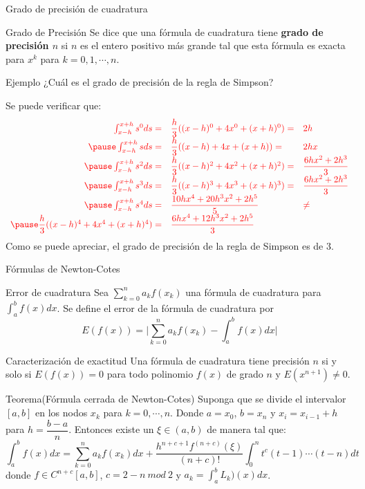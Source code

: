 \begin{frame}{Grado de precisión de cuadratura}
\small
\begin{block}{Grado de Precisión}
Se dice que una fórmula de cuadratura tiene \textbf{grado de precisión $n$} si $n$ es el entero positivo más grande tal que esta fórmula es exacta para $x^k$ para $k=0,1,\cdots, n$.  
\end{block}\pause
\begin{block}{Ejemplo}
¿Cuál es el grado de precisión de la regla de Simpson?
\end{block}\pause
Se puede verificar que:\pause
\vspace*{-0.5cm}
\begin{displaymath}
\textcolor{red}{
\begin{array}{rll}
\int_{x-h}^{x+h}s^0ds=&\dfrac{h}{3}((x-h)^0+4x^0+(x+h)^0)=&2h\\\pause
\int_{x-h}^{x+h}sds=&\dfrac{h}{3}((x-h)+4x+(x+h))=&2hx\\\pause
\int_{x-h}^{x+h}s^2ds=&\dfrac{h}{3}((x-h)^2+4x^2+(x+h)^2)=&\dfrac{6hx^2+2h^3}{3}\\\pause
\int_{x-h}^{x+h}s^3ds=&\dfrac{h}{3}((x-h)^3+4x^3+(x+h)^3)=&\dfrac{6hx^2+2h^3}{3}\\\pause
\int_{x-h}^{x+h}s^4ds=&\dfrac{10hx^4+20h^3x^2+2h^5}{5}&\neq\\\pause
\dfrac{h}{3}((x-h)^4+4x^4+(x+h)^4)=&\dfrac{6hx^4+12h^3x^2+2h^5}{3}&
\end{array}}
\end{displaymath} 
\scriptsize
Como se puede apreciar, el grado de precisión de la regla de Simpson es de 3.
\end{frame}
\begin{frame}{Fórmulas de Newton-Cotes}
\scriptsize
\begin{block}{Error de cuadratura}
Sea $\displaystyle \sum_{k=0}^{n}a_kf(x_k)$ una fórmula de cuadratura para $\displaystyle \int_{a}^{b}f(x)dx$. Se define el error de la fórmula de cuadratura por $$\displaystyle E(f(x))=\bigg|\sum_{k=0}^{n}a_kf(x_k)-\int_{a}^{b}f(x)dx\bigg|$$
\end{block}
\begin{block}{Caracterización de exactitud}
Una fórmula de cuadratura tiene precisión $n$ si y solo si $E(f(x))=0$ para todo polinomio $f(x)$ de grado $n$ y $E(x^{n+1})\neq 0$.
\end{block}
\begin{block}{Teorema(Fórmula cerrada de Newton-Cotes)}
Suponga que se divide el intervalor $[a,b]$ en los nodos $x_k$ para $k=0,\cdots, n$. Donde $a=x_0$, $b=x_n$ y $x_i=x_{i-1}+h$ para $h=\dfrac{b-a}{n}$. Entonces existe un $\xi\in(a,b)$ de manera tal que:
$$\int_a^b f(x)dx=\sum_{k=0}^{n}a_kf(x_k)dx+\dfrac{h^{n+c+1}f^{(n+c)}(\xi)}{(n+c)!}\int_{0}^{n}t^c(t-1)\cdots(t-n)dt$$
donde $f\in C^{n+c}[a,b]$, $c=2-n\ mod\ 2$ y $\displaystyle a_k=\int_{a}^{b}L_k)(x)dx$.
\end{block}
\end{frame}
